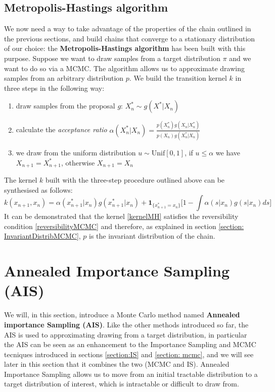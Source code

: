 \documentclass[12pt,mythesisstyle]{report}
\begin{document}
\subsection{Metropolis-Hastings algorithm}\label{section:MetropolisHastings}
We now need a way to take advantage of the properties of the chain outlined in the previous sections, and build chains that converge to a stationary distribution of our choice: the \textbf{Metropolis-Hastings algorithm} \cite{Metropolis} \cite{Hastings} has been built with this purpose. Suppose we want to draw samples from a target distribution $\pi$ and we want to do so via a MCMC. The algorithm allows us to approximate drawing samples from an arbitrary distribution $p$. We build the transition kernel $k$ in three steps in the following way:
\begin{enumerate}
	\item draw samples from the proposal $g$: $X^*_n \sim g(X^*|X_n)$
	\item calculate the \textit{acceptance ratio}  $\alpha(X^*_n|X_n)=\frac{p(X^*_n)g(X_n|X^*_n)}{p(X_n)g(X^*_n|X_n)}$
	\item we draw from the uniform distribution $u \sim \text{Unif}[0,1]$, if $u\leq\alpha$ we have $X_{n+1}=X^*_{n+1}$, otherwise $X_{n+1}=X_n$
\end{enumerate}
The kernel $k$ built with the three-step procedure outlined above can be synthesised as follows:
\begin{equation}\label{kernelMH}
k(x_{n+1}, x_{n})=\alpha(x^*_{n+1} | x_n)g(x^*_{n+1} | x_n)+\mathbf{1}_{\bigl\{x^*_{n+1}=x_n\bigr\}}\bigg[1 - \int \alpha (s | x_n)g(s|x_n)ds\bigg]
\end{equation}
It can be demonstrated \cite{mcmcnotes} \cite {RobertCasella} that the kernel \eqref{kernelMH} satisfies the reversibility condition \eqref{reversibilityMCMC} and therefore, as explained in section \ref{section: InvariantDistribMCMC}, $p$ is the invariant distribution of the chain.

\section{Annealed Importance Sampling (AIS)}\label{section: AIS}
We will, in this section, introduce a Monte Carlo method named \textbf{Annealed importance Sampling (AIS)}. Like the other methods introduced so far, the AIS is used to approximating drawing from a target distribution, in particular the AIS can be seen as an enhancement \cite{annealedis} to the Importance Sampling and MCMC tecniques introduced in sections \ref{section:IS} and \ref{section: mcmc}, and we will see later in this section that it combines the two (MCMC and IS). Annealed Importance Sampling allows us to move from an initial tractable distribution to a target distribution of interest, which is intractable or difficult to draw from.
\end{document}
